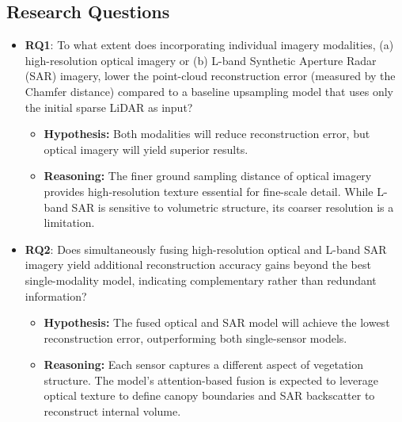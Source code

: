\documentclass[preprints,article,accept,pdftex,moreauthors]{Definitions/mdpi}
\begin{document}
\subsection{Research Questions}
\begin{itemize}
  \item \textbf{RQ1}: To what extent does incorporating individual imagery modalities, (a) high-resolution optical imagery or (b) L-band Synthetic Aperture Radar (SAR) imagery, lower the point-cloud reconstruction error (measured by the Chamfer distance) compared to a baseline upsampling model that uses only the initial sparse LiDAR as input?
        \begin{itemize}
          \item \textbf{Hypothesis:} Both modalities will reduce reconstruction error, but optical imagery will yield superior results.
          \item \textbf{Reasoning:} The finer ground sampling distance of optical imagery provides high-resolution texture essential for fine-scale detail. While L-band SAR is sensitive to volumetric structure, its coarser resolution is a limitation.
        \end{itemize}

  \item \textbf{RQ2}: Does simultaneously fusing high-resolution optical and L-band SAR imagery yield additional reconstruction accuracy gains beyond the best single-modality model, indicating complementary rather than redundant information?
        \begin{itemize}
          \item \textbf{Hypothesis:} The fused optical and SAR model will achieve the lowest reconstruction error, outperforming both single-sensor models.
          \item \textbf{Reasoning:} Each sensor captures a different aspect of vegetation structure. The model's attention-based fusion is expected to leverage optical texture to define canopy boundaries and SAR backscatter to reconstruct internal volume.
        \end{itemize}


\end{itemize}
\end{document}
